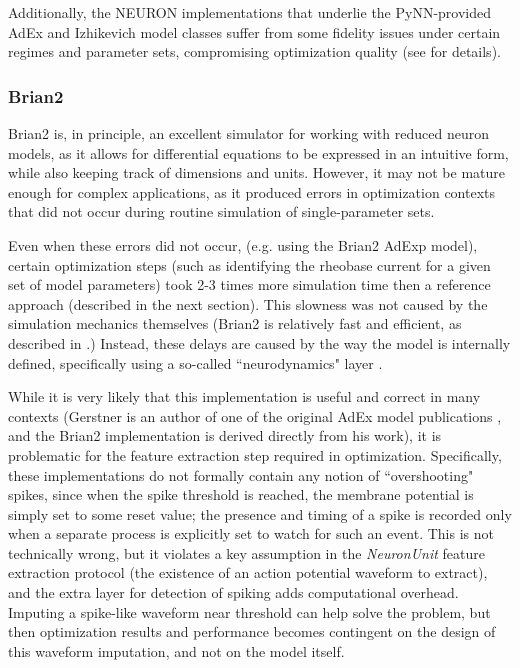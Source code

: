 
Additionally, the NEURON implementations that underlie the PyNN-provided AdEx and Izhikevich model classes suffer from some fidelity issues under certain regimes and parameter sets, compromising optimization quality (see \cite{neuralensembleadexp2, neuralensembleadexp} for details).

\subsubsection{Brian2}
Brian2 \citep{stimberg2019brian} is, in principle, an excellent simulator for working with reduced neuron models, as it allows for differential equations to be expressed in an intuitive form, while also keeping track of dimensions and units.
However, it may not be mature enough for complex applications, as it produced errors in optimization contexts that did not occur during routine simulation of single-parameter sets.

Even when these errors did not occur, (e.g. using the Brian2 AdExp model), certain optimization steps (such as identifying the rheobase current for a given set of model parameters) took 2-3 times more simulation time then a reference approach (described in the next section).
This slowness was not caused by the simulation mechanics themselves (Brian2 is relatively fast and efficient, as described in \cite{stimberg2019brian}.)
Instead, these delays are caused by the way the model is internally defined, specifically using a
so-called ``neurodynamics" layer \citep{gerstner2014neuronal}.

While it is very likely that this implementation is useful and correct in many contexts (Gerstner is an author of one of the original AdEx model publications \citep{brette2005adaptive}, and the Brian2 implementation is derived directly from his work), it is problematic for the feature extraction step required in optimization.
Specifically, these implementations do not formally contain any notion of ``overshooting" spikes, since when the spike threshold is reached, the membrane potential is simply set to some reset value; the presence and timing of a spike is recorded only when a separate process is explicitly set to watch for such an event.
This is not technically wrong, but it violates a key assumption in the \emph{NeuronUnit} feature extraction protocol (the existence of an action potential waveform to extract), and the extra layer for detection of spiking adds computational overhead.
Imputing a spike-like waveform near threshold can help solve the problem, but then optimization results and performance becomes contingent on the design of this waveform imputation, and not on the model itself.

